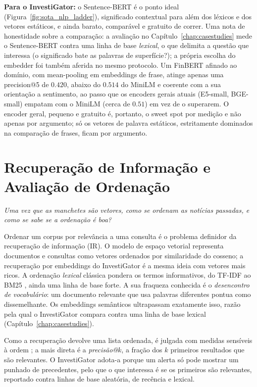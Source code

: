 \textbf{Para o InvestiGator:} o Sentence-BERT é o ponto ideal (Figura~\ref{fig:sota_nlp_ladder}),
significado contextual para além dos léxicos e dos vetores estáticos, e ainda barato, comparável e
gratuito de correr. Uma nota de honestidade sobre a comparação: a avaliação no
Capítulo~\ref{chap:casestudies} mede o Sentence-BERT contra uma linha de base \emph{lexical}, o que
delimita a questão que interessa (o significado bate as palavras de superfície?); a própria escolha do
embedder foi também aferida no mesmo protocolo. Um FinBERT afinado ao domínio, com mean-pooling em
embeddings de frase, atinge apenas uma precision@5 de $0.420$, abaixo do $0.514$ do MiniLM e coerente
com a sua orientação a sentimento, ao passo que os encoders gerais atuais (E5-small, BGE-small) empatam
com o MiniLM (cerca de $0.51$) em vez de o superarem. O encoder geral, pequeno e gratuito é, portanto, o
sweet spot por medição e não apenas por argumento; só os vetores de palavra estáticos, estritamente
dominados na comparação de frases, ficam por argumento.

\section{Recuperação de Informação e Avaliação de Ordenação}
\label{sec:sota_ir}

\emph{Uma vez que as manchetes são vetores, como se ordenam as notícias passadas, e como se sabe se a
ordenação é boa?}

Ordenar um corpus por relevância a uma consulta é o problema definidor da recuperação de informação (IR).
O modelo de espaço vetorial \autocite{salton1975vsm} representa documentos e consultas como vetores
ordenados por similaridade do cosseno; a recuperação por embeddings do InvestiGator é a mesma ideia com
vetores mais ricos. A ordenação \emph{lexical} clássica pondera os termos informativos, do TF-IDF ao BM25
\autocite{robertson2009bm25}, ainda uma linha de base forte. A sua fraqueza conhecida é o \emph{desencontro
de vocabulário}: um documento relevante que usa palavras diferentes pontua como dissemelhante. Os
embeddings semânticos ultrapassam exatamente isso, razão pela qual o InvestiGator compara contra uma linha
de base lexical (Capítulo~\ref{chap:casestudies}).

Como a recuperação devolve uma lista ordenada, é julgada com medidas sensíveis à ordem
\autocite{manning2008ir}; a mais direta é a \emph{precisão@$k$}, a fração dos $k$ primeiros resultados que
são relevantes. O InvestiGator adota-a porque um alerta só pode mostrar um punhado de precedentes, pelo que
o que interessa é se os primeiros são relevantes, reportado contra linhas de base aleatória, de recência e
lexical.

